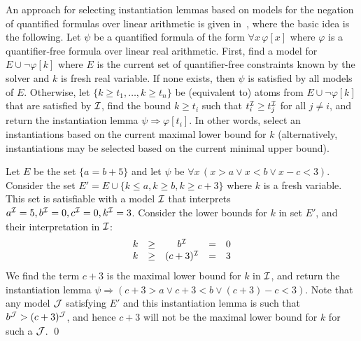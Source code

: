 \documentclass[oribibl]{llncs}
\begin{document}
An approach for selecting instantiation lemmas based on models for the negation of quantified formulas
over linear arithmetic is given in~\cite{InstLA2016}, where the basic idea is the following.
Let $\psi$ be a quantified formula of the form $\forall x\, \varphi[ x ]$ where $\varphi$ is a quantifier-free formula over linear real arithmetic.
First, find a model for $E \cup \neg \varphi[ k ]$ where $E$ is the current set of quantifier-free constraints known by the solver and $k$ is fresh real variable.
If none exists, then $\psi$ is satisfied by all models of $E$.
Otherwise, let $\{ k \geq t_1, \ldots, k \geq t_n \}$ be (equivalent to) atoms from $E \cup \neg \varphi[ k ]$ that are satisfied by $\mathcal{I}$,
find the bound $k \geq t_i$ such that $t_i^{\mathcal{I}} \geq t_j^{\mathcal{I}}$ for all $j \neq i$,
and return the instantiation lemma $\psi \Rightarrow \varphi[ t_i ]$.
In other words, select an instantiations based on the current maximal lower bound for $k$ (alternatively, instantiations may be selected based on the current minimal upper bound).

\begin{example}
\label{ex:cegqi}
Let $E$ be the set $\{ a=b+5 \}$ and let $\psi$ be $\forall x\, (x>a \vee x<b \vee x-c<3)$.
Consider the set $E' = E \cup \{ k \leq a, k \geq b, k \geq c+3 \}$ where $k$ is a fresh variable.
This set is satisfiable with a model $\mathcal{I}$ that interprets $a^{\mathcal{I}} = 5, b^{\mathcal{I}} = 0, c^{\mathcal{I}} = 0, k^{\mathcal{I}} = 3$.
Consider the lower bounds for $k$ in set $E'$, and their interpretation in $\mathcal{I}$:
\[
\begin{array}{ccccc}
k & \geq & b^{\mathcal{I}} & = & 0 \\
k & \geq & (c+3)^{\mathcal{I}} & = & 3 \\
\end{array}
\]
We find the term $c+3$ is the maximal lower bound for $k$ in $\mathcal{I}$,
and return the instantiation lemma $\psi \Rightarrow ( c+3>a \vee c+3<b \vee (c+3)-c<3 )$.
Note that any model $\mathcal{J}$ satisfying $E'$ and this instantiation lemma is such that $b^{\mathcal{J}} > (c+3)^{\mathcal{J}}$,
and hence $c+3$ will not be the maximal lower bound for $k$ for such a $\mathcal{J}$.
\qed
\end{example}
\end{document}
